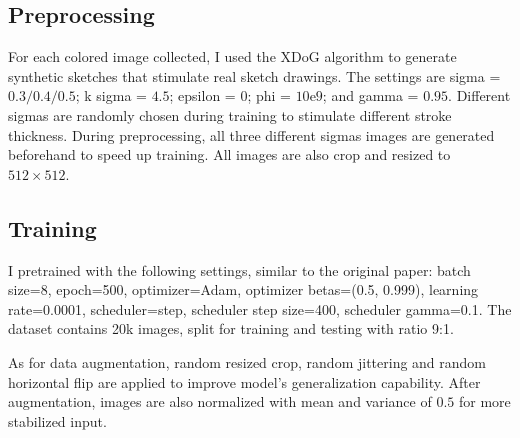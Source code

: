 \subsection{Preprocessing}
For each colored image collected, I used the XDoG\cite{winnemollerXDoGEXtendedDifferenceofGaussians2012} algorithm to generate synthetic sketches that stimulate real sketch drawings. The settings are sigma = $0.3/0.4/0.5$; k sigma = $4.5$; epsilon = $0$; phi = $10\mathrm{e}9$; and gamma = $0.95$. Different sigmas are randomly chosen during training to stimulate different stroke thickness. During preprocessing, all three different sigmas images are generated beforehand to speed up training. All images are also crop and resized to $512\times512$.

\subsection{Training}
I pretrained with the following settings, similar to the original paper: batch size=8, epoch=500, optimizer=Adam, optimizer betas=(0.5, 0.999), learning rate=0.0001, scheduler=step, scheduler step size=400, scheduler gamma=0.1. The dataset contains 20k images, split for training and testing with ratio 9:1.

As for data augmentation, random resized crop, random jittering and random horizontal flip are applied to improve model's generalization capability. After augmentation, images are also normalized with mean and variance of $0.5$ for more stabilized input.




